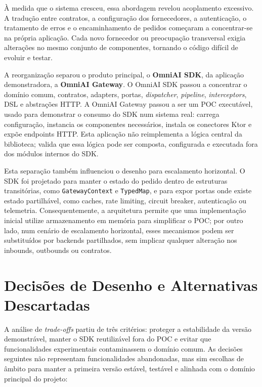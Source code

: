 \documentclass[11pt,a4paper]{report}
\begin{document}
    À medida que o sistema cresceu, essa abordagem revelou acoplamento excessivo. A tradução entre contratos, a configuração dos fornecedores, a autenticação, o tratamento de erros e o encaminhamento de pedidos começaram a concentrar-se na própria aplicação. Cada novo fornecedor ou preocupação transversal exigia alterações no mesmo conjunto de componentes, tornando o código difícil de evoluir e testar.

    A reorganização separou o produto principal, o \textbf{OmniAI SDK}, da aplicação demonstradora, a \textbf{OmniAI Gateway}. O OmniAI SDK passou a concentrar o domínio comum, contratos, adapters, portas, \textit{dispatcher}, \textit{pipeline}, \textit{interceptors}, DSL e abstrações HTTP. A OmniAI Gateway passou a ser um POC executável, usado para demonstrar o consumo do SDK num sistema real: carrega configuração, instancia os componentes necessários, instala os conectores Ktor e expõe endpoints HTTP. Esta aplicação não reimplementa a lógica central da biblioteca; valida que essa lógica pode ser composta, configurada e executada fora dos módulos internos do SDK.

    Esta separação também influenciou o desenho para escalamento horizontal. O SDK foi projetado para manter o estado do pedido dentro de estruturas transitórias, como \texttt{GatewayContext} e \texttt{TypedMap}, e para expor portas onde existe estado partilhável, como caches, rate limiting, circuit breaker, autenticação ou telemetria. Consequentemente, a arquitetura permite que uma implementação inicial utilize armazenamento em memória para simplificar o POC; por outro lado, num cenário de escalamento horizontal, esses mecanismos podem ser substituídos por backends partilhados, sem implicar qualquer alteração nos inbounds, outbounds ou contratos.

    \section{Decisões de Desenho e Alternativas Descartadas}
    A análise de \textit{trade-offs} partiu de três critérios: proteger a estabilidade da versão demonstrável, manter o SDK reutilizável fora do POC e evitar que funcionalidades experimentais contaminassem o domínio comum. As decisões seguintes não representam funcionalidades abandonadas, mas sim escolhas de âmbito para manter a primeira versão estável, testável e alinhada com o domínio principal do projeto:
\end{document}
